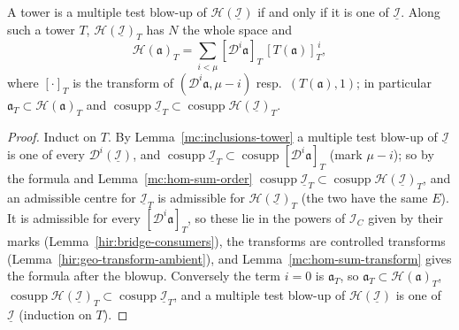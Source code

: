 \begin{lemma}
\label{mc:homogenized-tower}
\leanok
A tower is a multiple test blow-up of \(\mathcal H(\underline{\mathcal I})\) if and only if it is one of \(\underline{\mathcal I}\). Along such a tower \(T\),
\(\mathcal H(\underline{\mathcal I})_T\) has \(N\) the whole space and
\[
 \mathcal H(\mathfrak a)_T=\sum_{i<\mu}[\mathcal D^i\mathfrak a]_T\,[T(\mathfrak a)]_T^{\,i},
\]
where \([\cdot]_T\) is the transform of \((\mathcal D^i\mathfrak a,\mu-i)\) resp.\ \((T(\mathfrak a),1)\); in particular
\(\mathfrak a_T\subset\mathcal H(\mathfrak a)_T\) and \(\operatorname{cosupp}\underline{\mathcal I}_T\subset\operatorname{cosupp}\mathcal H(\underline{\mathcal I})_T\).
\end{lemma}
\begin{proof}
\leanok
Induct on \(T\). By Lemma~\ref{mc:inclusions-tower} a multiple test blow-up of \(\underline{\mathcal I}\) is one of every \(\mathcal D^i(\underline{\mathcal I})\), and
\(\operatorname{cosupp}\underline{\mathcal I}_T\subset\operatorname{cosupp}[\mathcal D^i\mathfrak a]_T\) (mark \(\mu-i\)); so by the formula and Lemma~\ref{mc:hom-sum-order}
\(\operatorname{cosupp}\underline{\mathcal I}_T\subset\operatorname{cosupp}\mathcal H(\underline{\mathcal I})_T\), and an admissible centre for
\(\underline{\mathcal I}_T\) is admissible for \(\mathcal H(\underline{\mathcal I})_T\) (the two have the same \(E\)). It is admissible for every
\([\mathcal D^i\mathfrak a]_T\), so these lie in the powers of \(\mathcal I_C\) given by their marks (Lemma~\ref{hir:bridge-consumers}), the transforms are controlled
transforms (Lemma~\ref{hir:geo-transform-ambient}), and Lemma~\ref{mc:hom-sum-transform} gives the formula after the blowup. Conversely the term \(i=0\) is
\(\mathfrak a_T\), so \(\mathfrak a_T\subset\mathcal H(\mathfrak a)_T\), \(\operatorname{cosupp}\mathcal H(\underline{\mathcal I})_T\subset\operatorname{cosupp}\underline{\mathcal I}_T\),
and a multiple test blow-up of \(\mathcal H(\underline{\mathcal I})\) is one of \(\underline{\mathcal I}\) (induction on \(T\)).
\end{proof}

